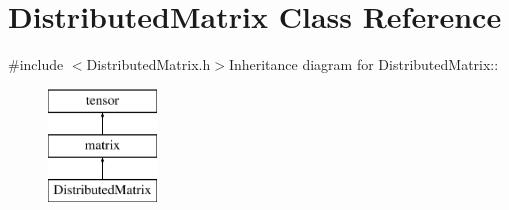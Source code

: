 \hypertarget{classJKBuilder_1_1DistributedMatrix}{
\section{DistributedMatrix Class Reference}
\label{classJKBuilder_1_1DistributedMatrix}
}


{\ttfamily \#include $<$DistributedMatrix.h$>$}Inheritance diagram for DistributedMatrix::\begin{figure}[H]
\begin{center}
\leavevmode
\includegraphics[height=3cm]{classJKBuilder_1_1DistributedMatrix}
\end{center}
\end{figure}
